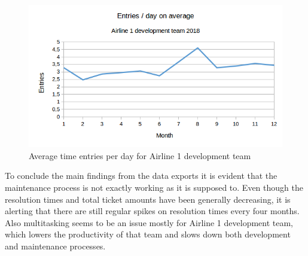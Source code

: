 \begin{figure}[H]
  \begin{center}
    \includegraphics[width=1.0\textwidth]{images/dev-team-entries-before-2.png}
    \caption{Average time entries per day for Airline 1 development team}
    \label{fig:dev-team-toggl-before}
  \end{center}
\end{figure}

To conclude the main findings from the data exports it is evident that the maintenance process is not exactly working as it is supposed to. Even though the resolution times and total ticket
amounts have been generally decreasing, it is alerting that there are still regular spikes on resolution times every four months. Also multitasking seems to be an issue mostly for Airline 1
development team, which lowers the productivity of that team and slows down both development and maintenance processes.
